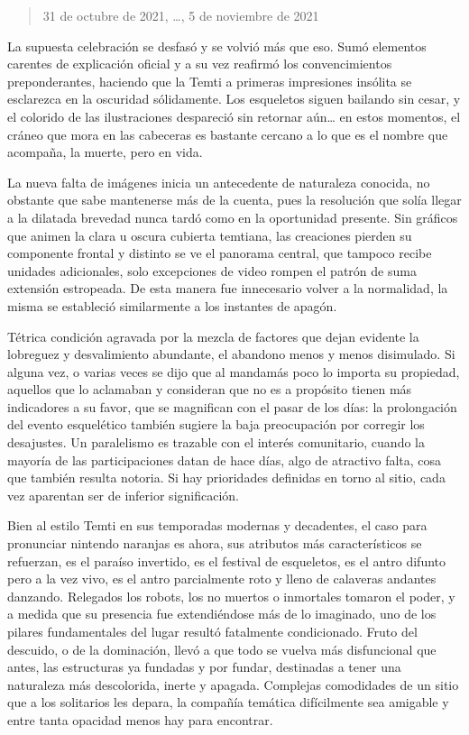 \documentclass[
]{book}
\begin{document}
\begin{quote}
31 de octubre de 2021, \ldots, 5 de noviembre de 2021
\end{quote}

La supuesta celebración se desfasó y se volvió más que eso. Sumó elementos carentes de explicación oficial y a su vez reafirmó los convencimientos preponderantes, haciendo que la Temti a primeras impresiones insólita se esclarezca en la oscuridad sólidamente. Los esqueletos siguen bailando sin cesar, y el colorido de las ilustraciones despareció sin retornar aún\ldots{} en estos momentos, el cráneo que mora en las cabeceras es bastante cercano a lo que es el nombre que acompaña, la muerte, pero en vida.

La nueva falta de imágenes inicia un antecedente de naturaleza conocida, no obstante que sabe mantenerse más de la cuenta, pues la resolución que solía llegar a la dilatada brevedad nunca tardó como en la oportunidad presente. Sin gráficos que animen la clara u oscura cubierta temtiana, las creaciones pierden su componente frontal y distinto se ve el panorama central, que tampoco recibe unidades adicionales, solo excepciones de video rompen el patrón de suma extensión estropeada. De esta manera fue innecesario volver a la normalidad, la misma se estableció similarmente a los instantes de apagón.

Tétrica condición agravada por la mezcla de factores que dejan evidente la lobreguez y desvalimiento abundante, el abandono menos y menos disimulado. Si alguna vez, o varias veces se dijo que al mandamás poco lo importa su propiedad, aquellos que lo aclamaban y consideran que no es a propósito tienen más indicadores a su favor, que se magnifican con el pasar de los días: la prolongación del evento esquelético también sugiere la baja preocupación por corregir los desajustes. Un paralelismo es trazable con el interés comunitario, cuando la mayoría de las participaciones datan de hace días, algo de atractivo falta, cosa que también resulta notoria. Si hay prioridades definidas en torno al sitio, cada vez aparentan ser de inferior significación.

Bien al estilo Temti en sus temporadas modernas y decadentes, el caso para pronunciar nintendo naranjas es ahora, sus atributos más característicos se refuerzan, es el paraíso invertido, es el festival de esqueletos, es el antro difunto pero a la vez vivo, es el antro parcialmente roto y lleno de calaveras andantes danzando. Relegados los robots, los no muertos o inmortales tomaron el poder, y a medida que su presencia fue extendiéndose más de lo imaginado, uno de los pilares fundamentales del lugar resultó fatalmente condicionado. Fruto del descuido, o de la dominación, llevó a que todo se vuelva más disfuncional que antes, las estructuras ya fundadas y por fundar, destinadas a tener una naturaleza más descolorida, inerte y apagada. Complejas comodidades de un sitio que a los solitarios les depara, la compañía temática difícilmente sea amigable y entre tanta opacidad menos hay para encontrar.
\end{document}
